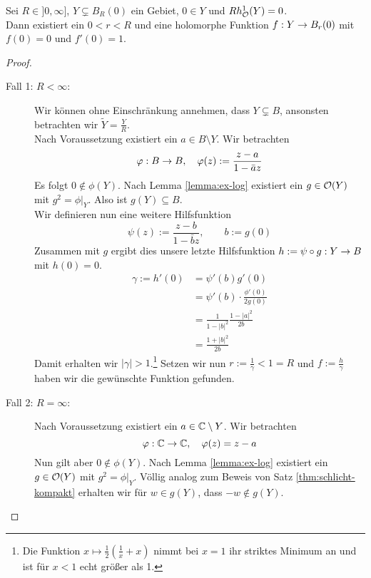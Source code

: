 \begin{lemma}
  \label{lemma:bihol-kreis}
  Sei $R \in ]0, \infty]$, $Y \subsetneq B_R(0)$ ein Gebiet, $0 \in Y$
  und $Rh_{\mathcal{O}}^1(Y) = 0$. \\
  Dann existiert ein $0< r <R$ und eine holomorphe Funktion $f: Y \rightarrow B_r(0)$ mit $f(0) =
  0$ und $f'(0) = 1$.
\end{lemma}

\begin{proof}
  \begin{description}
  \item[Fall 1: $R < \infty$:] Wir können ohne Einschränkung annehmen,
    dass $Y \subsetneq B$, ansonsten betrachten wir $\tilde Y =
    \frac{Y}{R}$. \\
    Nach Voraussetzung existiert ein $a \in B \setminus Y$. Wir
    betrachten
    \[
    \varphi: B \rightarrow B, \quad \varphi(z) := \frac{z-a}{1-\bar a z}
    \]
    Es folgt $0 \notin \phi(Y)$. Nach Lemma \ref{lemma:ex-log} existiert ein
    $g \in \mathcal{O}(Y)$ mit $g^2 = \phi|_Y$. Also ist $g(Y) \subseteq
    B$. \\
    Wir definieren nun eine weitere Hilfsfunktion
    \[
    \psi(z) := \frac{z-b}{1 - \bar b z}, \qquad b:= g(0)
    \]
    Zusammen mit $g$ ergibt dies unsere letzte Hilfsfunktion $h :=
    \psi \circ g: Y \rightarrow B$ mit $h(0) = 0$.
    \begin{align*}
      \gamma := h'(0) & = \psi'(b) g'(0) \\
      & = \psi'(b) \cdot \frac{\phi'(0)}{2 g(0)} \\
      & = \frac{1}{1-|b|^2} \frac{1-|a|^2}{2b} \\
      & = \frac{1 + |b|^2}{2b}
    \end{align*}
    Damit erhalten wir $|\gamma| > 1$.\footnote{Die Funktion $x \mapsto
    \frac12 \left ( \frac1x + x \right )$ nimmt bei $x = 1$ ihr
    striktes Minimum an und ist für $x< 1$ echt größer als 1.} Setzen
    wir nun $r := \frac{1}{\gamma} < 1 = R$ und $f :=
    \frac{h}{\gamma}$ haben wir die gewünschte Funktion gefunden.
  \item[Fall 2: $R = \infty$:] Nach Voraussetzung existiert ein $a \in
    \mathbb{C} \setminus Y$. Wir betrachten
    \[
    \varphi: \mathbb{C} \rightarrow \mathbb{C}, \quad \varphi(z) = z -a
    \]
    Nun gilt aber $0 \notin \phi(Y)$. Nach Lemma \ref{lemma:ex-log}
    existiert ein $g \in \mathcal{O}(Y)$ mit $g^2 = \phi|_Y$. Völlig analog
    zum Beweis von Satz \ref{thm:schlicht-kompakt} erhalten wir für $w
    \in g(Y)$, dass $-w \notin g(Y)$. \\

\end{description}
\end{proof}
